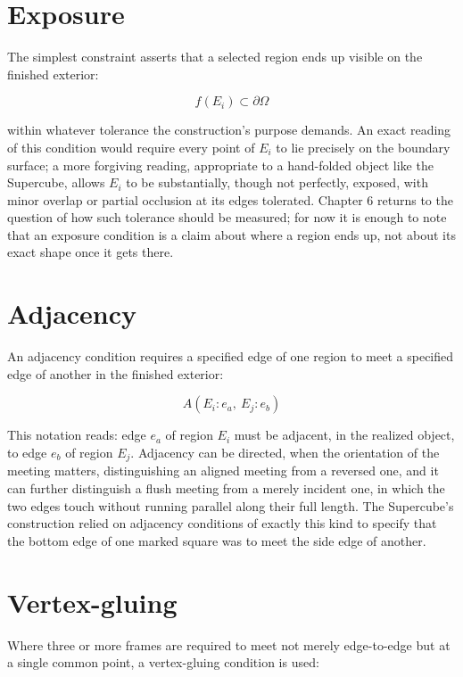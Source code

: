 \documentclass[11pt,oneside]{book}
\begin{document}
\hypertarget{exposure}{%
\section{Exposure}\label{exposure}}

The simplest constraint asserts that a selected region ends up visible
on the finished exterior:

\[f(E_i) \subset \partial\Omega\]

within whatever tolerance the construction's purpose demands. An exact
reading of this condition would require every point of \(E_i\) to lie
precisely on the boundary surface; a more forgiving reading, appropriate
to a hand-folded object like the Supercube, allows \(E_i\) to be
substantially, though not perfectly, exposed, with minor overlap or
partial occlusion at its edges tolerated. Chapter 6 returns to the
question of how such tolerance should be measured; for now it is enough
to note that an exposure condition is a claim about where a region ends
up, not about its exact shape once it gets there.

\hypertarget{adjacency}{%
\section{Adjacency}\label{adjacency}}

An adjacency condition requires a specified edge of one region to meet a
specified edge of another in the finished exterior:

\[A(E_i:e_a,\ E_j:e_b)\]

This notation reads: edge \(e_a\) of region \(E_i\) must be adjacent, in
the realized object, to edge \(e_b\) of region \(E_j\). Adjacency can be
directed, when the orientation of the meeting matters, distinguishing an
aligned meeting from a reversed one, and it can further distinguish a
flush meeting from a merely incident one, in which the two edges touch
without running parallel along their full length. The Supercube's
construction relied on adjacency conditions of exactly this kind to
specify that the bottom edge of one marked square was to meet the side
edge of another.

\hypertarget{vertex-gluing}{%
\section{Vertex-gluing}\label{vertex-gluing}}

Where three or more frames are required to meet not merely edge-to-edge
but at a single common point, a vertex-gluing condition is used:
\end{document}
